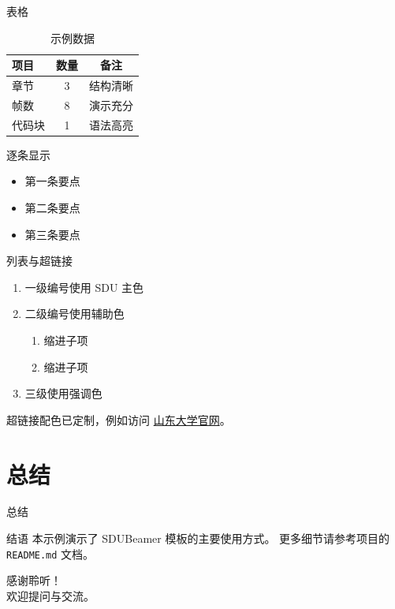 \documentclass[aspectratio=169]{beamer}
\begin{document}
\begin{frame}{表格}
  \begin{table}
    \centering
    \caption{示例数据}
    \begin{tabular}{lcc}
      \hline
      项目 & 数量 & 备注 \\
      \hline
      章节 & 3     & 结构清晰 \\
      帧数 & 8     & 演示充分 \\
      代码块 & 1   & 语法高亮 \\
      \hline
    \end{tabular}
  \end{table}
\end{frame}

\begin{frame}{逐条显示}
  \begin{itemize}[<+->]
    \item 第一条要点
    \item 第二条要点
    \item 第三条要点
  \end{itemize}
\end{frame}

\begin{frame}{列表与超链接}
  \begin{enumerate}
    \item 一级编号使用 SDU 主色
    \item 二级编号使用辅助色\begin{enumerate}\item 缩进子项\item 缩进子项\end{enumerate}
    \item 三级使用强调色
  \end{enumerate}

  \vspace{0.5cm}
  超链接配色已定制，例如访问 \href{https://www.sdu.edu.cn}{山东大学官网}。
\end{frame}

\section{总结}

\begin{frame}
  \sectionpage
\end{frame}

\begin{frame}{总结}
  \begin{block}{结语}
    本示例演示了 SDUBeamer 模板的主要使用方式。
    更多细节请参考项目的 \texttt{README.md} 文档。
  \end{block}
  \begin{center}
    \large 感谢聆听！\\
    \normalsize 欢迎提问与交流。
  \end{center}
\end{frame}
\end{document}
